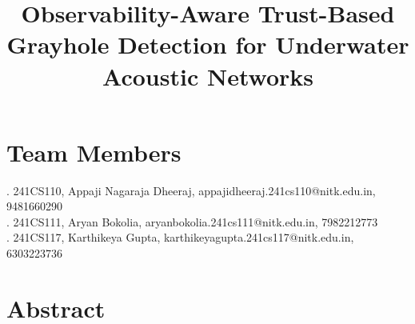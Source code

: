 \documentclass{article}
\title{\textbf{Observability-Aware Trust-Based Grayhole Detection for Underwater Acoustic Networks}}
\begin{document}

\maketitle

\section*{Team Members} 

. 241CS110, Appaji Nagaraja Dheeraj, appajidheeraj.241cs110@nitk.edu.in, 9481660290 \\
. 241CS111, Aryan Bokolia, aryanbokolia.241cs111@nitk.edu.in, 7982212773 \\
. 241CS117, Karthikeya Gupta, karthikeyagupta.241cs117@nitk.edu.in, 6303223736

\section*{Abstract}
\end{document}
